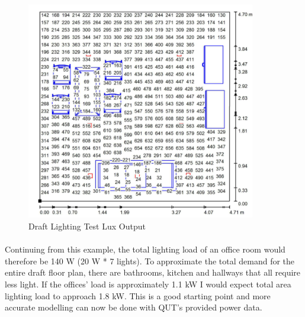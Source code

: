 \begin{figure}[H]
\hfill\includegraphics[width = 100mm]{images/lighting_draft_output}\hspace*{\fill}
\caption{Draft Lighting Test Lux Output} 
\label{fig:DraftLightingLux}
\end{figure} 

\paragraph{}
Continuing from this example, the total lighting load of an office room would therefore be 140 W (20 W * 7 lights). To approximate the total demand for the entire draft floor plan, there are bathrooms, kitchen and hallways that all require less light. If the offices' load is approximately 1.1 kW I would expect total area lighting load to approach 1.8 kW. This is a good starting point and more accurate modelling can now be done with QUT's provided power data. 